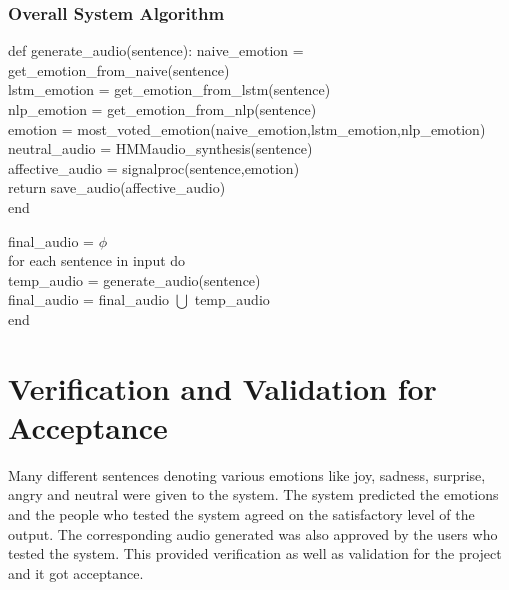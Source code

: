 \documentclass[oneside,a4paper,12pt]{book}
\begin{document}
  \subsubsection{Overall System Algorithm}
  def generate\_audio(sentence): \newline
	  \hspace*{10mm} naive\_emotion = get\_emotion\_from\_naive(sentence) \\
	  \hspace*{12mm}lstm\_emotion = get\_emotion\_from\_lstm(sentence) \\
	  \hspace*{12mm}nlp\_emotion = get\_emotion\_from\_nlp(sentence) \\
	  \hspace*{11mm} emotion = most\_voted\_emotion(naive\_emotion,lstm\_emotion,nlp\_emotion) \\
	  \hspace*{12mm}neutral\_audio = HMMaudio\_synthesis(sentence) \\
	  \hspace*{12mm}affective\_audio = signalproc(sentence,emotion) \\
	  \hspace*{12mm}return save\_audio(affective\_audio) \\
	  end \newline
	  
	  final\_audio = $\phi$ \\
	  \hspace*{11mm}for each sentence in input do \\
	  \hspace*{16mm}temp\_audio =  generate\_audio(sentence)\\
	  \hspace*{16mm}final\_audio = final\_audio $\bigcup$ temp\_audio \\
	  end\\
	  
  \section{Verification and Validation for Acceptance}
  Many different sentences denoting various emotions like joy, sadness, surprise, angry and neutral were given to the system. The system predicted the emotions and the people who tested the system agreed on the satisfactory level of the output. The corresponding audio generated was also approved by the users who tested the system. This provided verification as well as validation for the project and it got acceptance.
  
\end{document}
